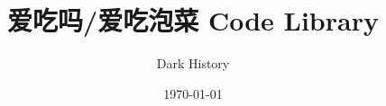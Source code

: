 \documentclass[a4paper]{article}
\begin{document}
\title{\Huge \bf 爱吃吗/爱吃泡菜 Code Library}
\author{Dark History}
\date{\today }

\maketitle

\begin{multicols*}{3}
\tableofcontents
\end{multicols*}

\newpage

\columnseprule=0pt

\begin{multicols*}{2}

\end{multicols*}
\end{document}
